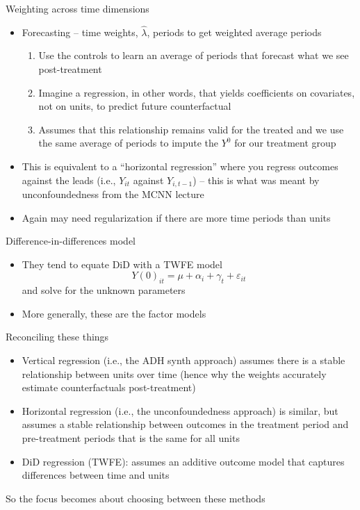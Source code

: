 \documentclass{beamer}
\begin{document}
\begin{frame}{Weighting across time dimensions}

\begin{itemize}
\item Forecasting -- time weights, $\widehat{\lambda}$,  periods to get weighted average periods
	\begin{enumerate}
	\item Use the controls to learn an average of periods that forecast what we see post-treatment
	\item Imagine a regression, in other words, that yields coefficients on covariates, not on units, to predict future counterfactual
	\item Assumes that this relationship remains valid for the treated and we use the same average of periods to impute the $Y^0$ for our treatment group
	\end{enumerate}
\item This is equivalent to a ``horizontal regression'' where you regress outcomes against the leads (i.e., $Y_{it}$ against $Y_{i,t-1}$) -- this is what was meant by unconfoundedness from the MCNN lecture
\item Again may need regularization if there are more time periods than units
\end{itemize}

\end{frame}

\begin{frame}{Difference-in-differences model}

\begin{itemize}
\item They tend to equate DiD with a TWFE model $$Y(0)_{it} = \mu + \alpha_i + \gamma_t + \varepsilon_{it}$$ and solve for the unknown parameters
\item More generally, these are the factor models 
\end{itemize}

\end{frame}

\begin{frame}{Reconciling these things}

\begin{itemize}
\item Vertical regression (i.e., the ADH synth approach) assumes there is a stable relationship between units over time (hence why the weights accurately estimate counterfactuals post-treatment)
\item Horizontal regression (i.e., the unconfoundedness approach) is similar, but assumes a stable relationship between outcomes in the treatment period and pre-treatment periods that is the same for all units
\item DiD regression (TWFE): assumes an additive outcome model that captures differences between time and units
\end{itemize}

\bigskip

So the focus becomes about choosing between these methods

\end{frame}
\end{document}
